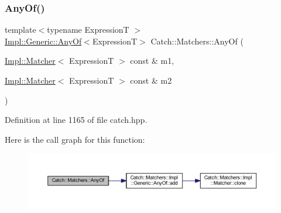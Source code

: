 \subsubsection{\texorpdfstring{Any\+Of()}{AnyOf()}\hspace{0.1cm}{\footnotesize\ttfamily [1/2]}}
{\footnotesize\ttfamily template$<$typename ExpressionT $>$ \\
\hyperlink{class_catch_1_1_matchers_1_1_impl_1_1_generic_1_1_any_of}{Impl\+::\+Generic\+::\+Any\+Of}$<$ExpressionT$>$ Catch\+::\+Matchers\+::\+Any\+Of (\begin{DoxyParamCaption}\item[{\hyperlink{struct_catch_1_1_matchers_1_1_impl_1_1_matcher}{Impl\+::\+Matcher}$<$ ExpressionT $>$ const \&}]{m1,  }\item[{\hyperlink{struct_catch_1_1_matchers_1_1_impl_1_1_matcher}{Impl\+::\+Matcher}$<$ ExpressionT $>$ const \&}]{m2 }\end{DoxyParamCaption})\hspace{0.3cm}{\ttfamily [inline]}}



Definition at line 1165 of file catch.\+hpp.

Here is the call graph for this function\+:\nopagebreak
\begin{figure}[H]
\begin{center}
\leavevmode
\includegraphics[width=350pt]{namespace_catch_1_1_matchers_a9cb139c71b9e391d5fc017764695bf84_cgraph}
\end{center}
\end{figure}
\hypertarget{namespace_catch_1_1_matchers_a8efb0e533db973b8aff1172fb908db02}{}\label{namespace_catch_1_1_matchers_a8efb0e533db973b8aff1172fb908db02} 
